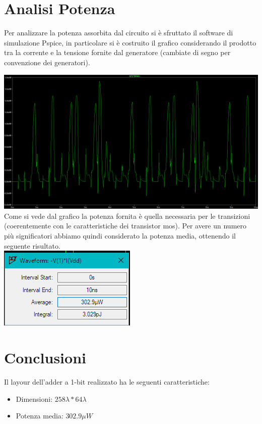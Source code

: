 \documentclass[12pt]{article} %
\begin{document}
\clearpage
\section{Analisi Potenza}

Per analizzare la potenza assorbita dal circuito si è sfruttato il software di simulazione Pspice, in particolare si è costruito il grafico considerando il prodotto tra la corrente e la tensione fornite dal generatore (cambiate di segno per convenzione dei generatori).

\includegraphics[scale = 0.35]{power}\\

Come si vede dal grafico la potenza fornita è quella necessaria per le transizioni (coerentemente con le caratteristiche dei transistor mos). Per avere un numero più significatori abbiamo quindi considerato la potenza media, ottenendo il seguente risultato.\\

\includegraphics[scale = 1]{powerAvg}

\clearpage
\section{Conclusioni}
Il layour dell'adder a 1-bit realizzato ha le seguenti caratteristiche:
\begin{itemize}
\item Dimensioni: \quad $258 \lambda * 64 \lambda$
\item Potenza media: \quad $302.9 \mu W$
\end{itemize}
\end{document}
